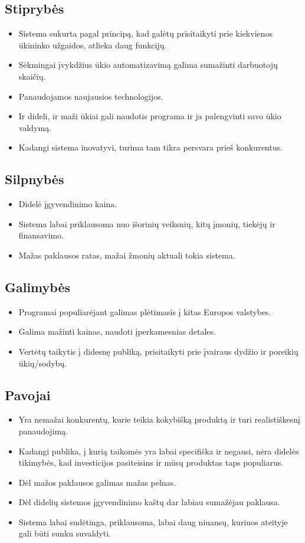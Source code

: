 \documentclass[oneside]{VUMIFPSkursinis}
\begin{document}
	\subsection{Stiprybės}
	\begin{itemize}
	\item Sistema sukurta pagal principą, kad galėtų prisitaikyti prie kiekvienos ūkininko užgaidos, atlieka daug funkcijų.
	\item Sėkmingai įvykdžius ūkio automatizavimą galima sumažinti darbuotojų skaičių.
	\item Panaudojamos naujausios technologijos.
	\item Ir dideli, ir maži ūkiai gali naudotis programa ir ja palengvinti savo ūkio valdymą.
	\item Kadangi sistema inovatyvi, turima tam tikra persvara prieš konkurentus.
	\end{itemize}
	\subsection{Silpnybės}
	\begin{itemize}
	\item Didelė įgyvendinimo kaina.
	\item Sistema labai priklausoma nuo išorinių veiksnių, kitų įmonių, tiekėjų ir finansavimo.
	\item Mažas paklausos ratas, mažai žmonių aktuali tokia sistema.
	\end{itemize}
	\subsection{Galimybės}
	\begin{itemize}
	\item Programai populiarėjant galimas plėtimasis į kitas Europos valstybes.
	\item Galima mažinti kainas, naudoti įperkamesnias detales.
	\item Vertėtų taikytis į didesnę publiką, prisitaikyti prie įvairaus dydžio ir poreikių ūkių/sodybų.
	\end{itemize}
	\subsection{Pavojai}
	\begin{itemize}
	\item Yra nemažai konkurentų, kurie teikia kokybišką produktą ir turi realistiškesnį panaudojimą.
	\item Kadangi publika, į kurią taikomės yra labai specifiška ir negausi, nėra didelės tikimybės, kad investicijos pasiteisins ir mūsų produktas taps populiarus.
	\item Dėl mažos paklausos galimas mažas pelnas.
	\item Dėl didelių sistemos įgyvendinimo kaštų dar labiau sumažėjau paklausa.
	\item Sistema labai sudėtinga, priklausoma, labai daug niuansų, kuriuos ateityje gali būti sunku suvaldyti.
	\end{itemize}
	
\end{document}
